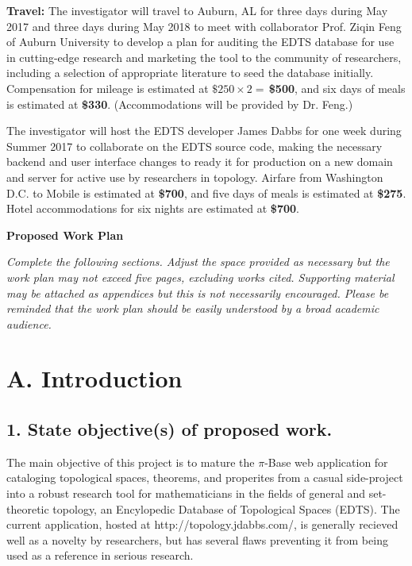 \documentclass[11pt]{article}
\begin{document}
\textbf{Travel:} The investigator will travel to Auburn, AL for three days during May 2017 and three days during May 2018 to meet with collaborator Prof. Ziqin Feng of Auburn University to develop a plan for auditing the EDTS database for use in cutting-edge research and marketing the tool to the community of researchers, including a selection of appropriate literature to seed the database initially.  Compensation for mileage is estimated at \(\$250\times2=\,\)\textbf{\$500}, and six days of meals is estimated at \textbf{\$330}. (Accommodations will be provided by Dr. Feng.)

The investigator will host the EDTS developer James Dabbs for one week during Summer 2017 to collaborate on the EDTS source code, making the necessary backend and user interface changes to ready it for production on a new domain and server for active use by researchers in topology. Airfare from Washington D.C. to Mobile is estimated at \textbf{\$700}, and five days of meals is estimated at \textbf{\$275}. Hotel accommodations for six nights are estimated at \textbf{\$700}.

\newpage




\centerline{\bf\Large
Proposed Work Plan
}

\textit{Complete the following sections. Adjust the space provided as necessary but the work plan may not exceed five pages, excluding works cited.  Supporting material may be attached as appendices but this is not necessarily encouraged.  Please be reminded that the work plan should be easily understood by a broad academic audience.}


\section*{A. Introduction}

\subsection*{1. State objective(s) of proposed work.}

The main objective of this project is to mature the \(\pi\)-Base web application
for cataloging topological spaces, theorems, and properites from a casual
side-project into a robust research tool for mathematicians in the fields of
general and set-theoretic topology, an Encylopedic Database of Topological
Spaces (EDTS). The current application, hosted at
http://topology.jdabbs.com/, is generally recieved well as a novelty by
researchers, but has several flaws preventing it from being used as a
reference in serious research.
\end{document}
